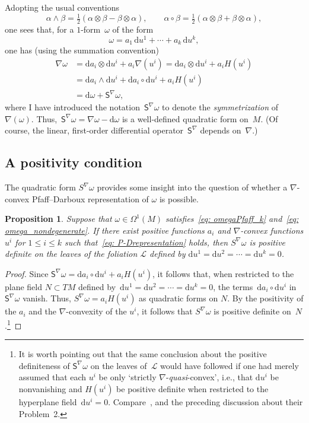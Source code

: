 \documentclass[10pt,a4paper]{amsart}
\renewcommand{\d}{\mathrm{d}}%
\newcommand{\cL}{{\mathcal L}}
\newcommand{\Ss}{\mathsf{S}}
\newcommand{\w}{\wedge}
\numberwithin{equation}{section}
\newtheorem{Proposition}[Theorem]{Proposition}
 { \theoremstyle{definition}
\newtheorem{Definition}[Theorem]{Definition}
\newtheorem{Note}[Theorem]{Note}
\newtheorem{Example}[Theorem]{Example}
\newtheorem{Remark}[Theorem]{Remark} }
\begin{document}
Adopting the usual conventions
\begin{equation*}%
\alpha\w\beta
= \tfrac12(\alpha\otimes\beta-\beta\otimes\alpha), \qquad
\alpha\circ\beta
= \tfrac12(\alpha\otimes\beta+\beta\otimes\alpha),
\end{equation*}
one sees that, for a $1$-form~$\omega$ of the form
\begin{equation}\label{eq: P-Drepresentation}
\omega = a_1\,\d u^1 + \cdots + a_k\,\d u^k,
\end{equation}
one has (using the summation convention)
\begin{align*}
\nabla\omega
&= \d a_i\otimes\d u^i + a_i \nabla(u^i) = \d a_i\otimes\d u^i + a_i H(u^i)\\
&= \d a_i\w\d u^i + \d a_i\circ\d u^i + a_i H(u^i)\\
&= \d\omega + \Ss^\nabla\omega,
\end{align*}
where I have introduced
the notation~$\Ss^\nabla\omega$ to denote the {\it symmetrization\/}
of~$\nabla(\omega)$. Thus,~$\Ss^\nabla\omega
= \nabla\omega- \d\omega$
is a well-defined quadratic form on~$M$.
(Of course, the linear, first-order differential operator~$\Ss^\nabla$
depends on~$\nabla$.)


\subsection{A positivity condition}\label{ssec: poscond}
The quadratic form $S^\nabla\omega$ provides some insight
into the question of whether a $\nabla$-convex Pfaff--Darboux
representation of $\omega$ is possible.

\begin{Proposition}\label{prop: ness cond}
Suppose that $\omega\in\Omega^1(M)$ satisfies~\eqref{eq: omegaPfaff_k}
and~\eqref{eq: omega_nondegenerate}. If there exist positive
functions $a_i$ and $\nabla$-convex functions $u^i$ for $1\le i\le k$
such that~\eqref{eq: P-Drepresentation} holds, then $S^\nabla\omega$
is positive definite on the leaves of the foliation $\cL$ defined by
$\d u^1 = \d u^2 = \cdots = \d u^k = 0$.
\end{Proposition}

\begin{proof}
Since $\Ss^\nabla\omega =\d a_i\circ \d u^i + a_i H(u^i)$,
it follows that, when restricted to the plane field ${N\subset TM}$
defined by~$\d u^1 = \d u^2 = \cdots = \d u^k = 0$,
the terms~$\d a_i\circ \d u^i$ in~$\Ss^\nabla\omega$
vanish. Thus, $S^\nabla\omega = a_i H(u^i)$
as quadratic forms on $N$. By the positivity of the $a_i$
and the $\nabla$-convexity of the $u^i$, it follows that
$S^\nabla\omega$ is positive definite on~$N$.\footnote{It is worth pointing out that the same conclusion
about the positive definiteness of $\Ss^\nabla\omega$ on the leaves of~$\cL$
would have followed if one had merely assumed that each $u^i$
be only `strictly $\nabla$-\emph{quasi}-convex',
i.e., that $\d u^i$ be nonvanishing and $H(u^i)$ be positive definite
when restricted to the hyperplane field~$\d u^i = 0$.
Compare~\cite[Lemma~1]{MR2023129},
and the preceding discussion about their Problem~2.}
\end{proof}
\end{document}
